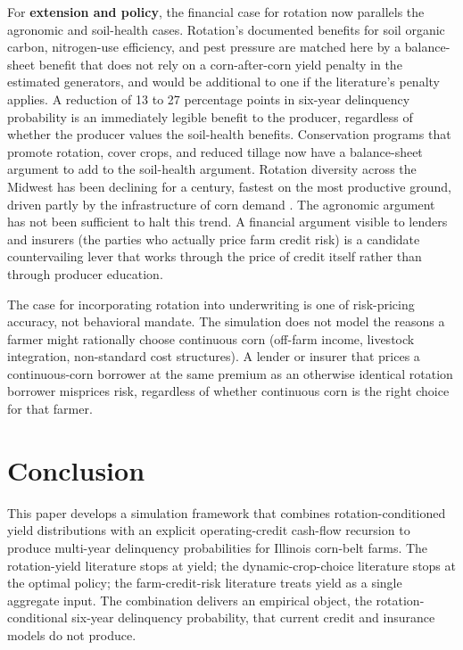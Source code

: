 \documentclass[11pt,letterpaper]{article}
\theoremstyle{remark}
\begin{document}
For \textbf{extension and policy}, the financial case for rotation now parallels the agronomic and soil-health cases. Rotation's documented benefits for soil organic carbon, nitrogen-use efficiency, and pest pressure \citep{Bullock1992} are matched here by a balance-sheet benefit that does not rely on a corn-after-corn yield penalty in the estimated generators, and would be additional to one if the literature's penalty applies. A reduction of 13 to 27 percentage points in six-year delinquency probability is an immediately legible benefit to the producer, regardless of whether the producer values the soil-health benefits. Conservation programs that promote rotation, cover crops, and reduced tillage now have a balance-sheet argument to add to the soil-health argument. Rotation diversity across the Midwest has been declining for a century, fastest on the most productive ground, driven partly by the infrastructure of corn demand \citep{socolar2021}. The agronomic argument has not been sufficient to halt this trend. A financial argument visible to lenders and insurers (the parties who actually price farm credit risk) is a candidate countervailing lever that works through the price of credit itself rather than through producer education.
 
The case for incorporating rotation into underwriting is one of risk-pricing accuracy, not behavioral mandate. The simulation does not model the reasons a farmer might rationally choose continuous corn (off-farm income, livestock integration, non-standard cost structures). A lender or insurer that prices a continuous-corn borrower at the same premium as an otherwise identical rotation borrower misprices risk, regardless of whether continuous corn is the right choice for that farmer.
 
\section{\label{sec:conclusion}Conclusion}
 
This paper develops a simulation framework that combines rotation-conditioned yield distributions with an explicit operating-credit cash-flow recursion to produce multi-year delinquency probabilities for Illinois corn-belt farms. The rotation-yield literature stops at yield; the dynamic-crop-choice literature stops at the optimal policy; the farm-credit-risk literature treats yield as a single aggregate input. The combination delivers an empirical object, the rotation-conditional six-year delinquency probability, that current credit and insurance models do not produce.
 
\end{document}
